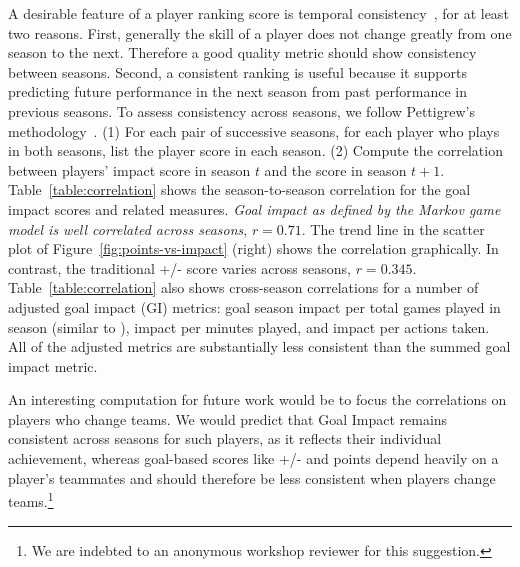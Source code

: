 \documentclass[runningheads,a4paper]{llncs}
\begin{document}
A desirable feature of a player ranking score is temporal consistency~\cite{Pettigrew2015}, for at least two reasons. First, generally the skill of a player does not change greatly from one season to the next. Therefore a good quality metric should show consistency between seasons. Second, a consistent ranking is useful because it supports predicting future performance in the next season from past performance in previous seasons. To assess consistency across seasons, we follow Pettigrew's methodology~\cite{Pettigrew2015}. (1) For each pair of successive seasons, for each player who plays in both seasons, list the player score in each season. (2) Compute the correlation between players' impact score in season $t$ and the score in season $t+1$.
%
%
Table~\ref{table:correlation} shows the season-to-season correlation for the goal impact scores and related measures. {\em Goal impact as defined by the Markov game model is well correlated across seasons}, $r = 0.71$. The trend line in the scatter plot of Figure~\ref{fig:points-vs-impact} (right) shows the correlation graphically. In contrast, the traditional +/- score varies across seasons, $r = 0.345$. Table~\ref{table:correlation} also shows cross-season correlations for a number of adjusted goal impact (GI) metrics: goal season impact per total games played in season (similar to \cite{Pettigrew2015}), impact per minutes played, and impact per actions taken. All of the adjusted metrics are substantially less consistent than the summed goal impact metric.

An interesting computation for future work would be to focus the correlations on players who change teams. We would predict that Goal Impact remains consistent across seasons for such players, as it reflects their individual achievement, whereas goal-based scores like +/- and points depend heavily on a player's teammates and should therefore be less consistent when players change teams.\footnote{We are indebted to an anonymous workshop reviewer for this suggestion.}

\begin{table}[htb]
\caption{Season-to-Season Correlations for Different Player Performance Metrics.}
\label{table:correlation}
\begin{center}
\end{center}
\end{table}
\end{document}
